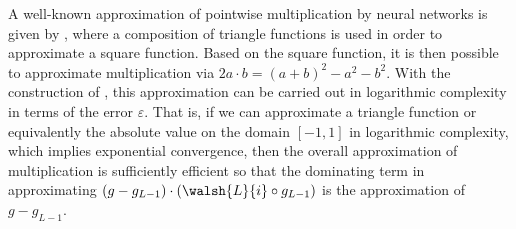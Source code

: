 \documentclass[twoside,11pt]{article}
\begin{document}
A well-known approximation of pointwise multiplication by neural networks is given by \cite{Yarotsky17ErrorBoundsApproximations}, where a composition of triangle functions is used in order to approximate a square function.
Based on the square function, it is then possible to approximate multiplication via $2a\cdot b=(a+b)^2-a^2-b^2$.
With the construction of \cite{Yarotsky17ErrorBoundsApproximations}, this approximation can be carried out in logarithmic complexity in terms of the error $\varepsilon$.
That is, if we can approximate a triangle function or equivalently the absolute value on the domain $[-1,1]$ in logarithmic complexity, which implies exponential convergence, then the overall approximation of multiplication is sufficiently efficient so that the dominating term in approximating $(g-g_{L-1})\cdot (\walsh{L}{i}\circ g_{L-1})$ is the approximation of $g-g_{L-1}$.
\end{document}

